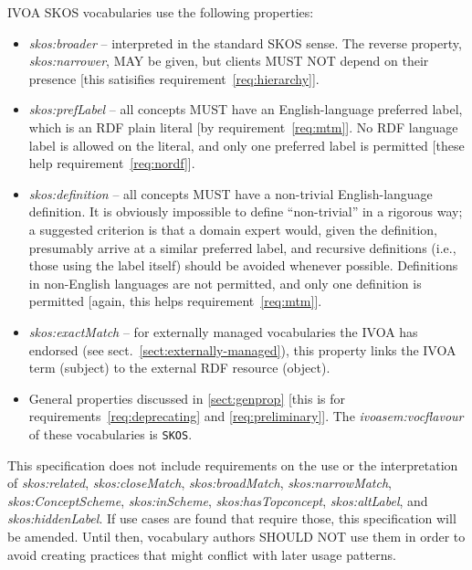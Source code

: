 \documentclass[11pt,a4paper]{ivoa}
\newcommand{\vocterm}[1]{\emph{\color{termcolor}#1}}
\begin{document}
IVOA SKOS vocabularies use the following properties:

\begin{itemize}
\item \vocterm{skos:broader} -- interpreted in the standard SKOS sense.
The reverse property, \vocterm{skos:narrower}, MAY be given, but clients
MUST NOT depend on their presence [this satisifies
requirement~\ref{req:hierarchy}].

\item \vocterm{skos:prefLabel} -- all concepts MUST have an
English-language preferred label, which is an RDF plain literal [by
requirement~\ref{req:mtm}].  No RDF language label is allowed on the
literal, and only one preferred label is permitted
[these help requirement~\ref{req:nordf}].

\item \vocterm{skos:definition} -- all concepts MUST have a non-trivial
English-language definition.  It is obviously impossible to define
``non-trivial'' in a rigorous way; a suggested criterion is that a
domain expert would, given the definition, presumably arrive at a
similar preferred label, and recursive definitions (i.e., those using
the label itself) should be avoided whenever possible.  Definitions in
non-English languages are not permitted, and only one definition is
permitted [again, this helps requirement~\ref{req:mtm}].

\item \vocterm{skos:exactMatch} -- for externally managed vocabularies
the IVOA has endorsed (see sect.~\ref{sect:externally-managed}), this
property links the IVOA term (subject) to the external RDF resource
(object).

\item General properties discussed in \ref{sect:genprop} [this is
for requirements~\ref{req:deprecating} and
\ref{req:preliminary}].  The \vocterm{ivoasem:vocflavour} of these
vocabularies is \verb|SKOS|.
\end{itemize}

This specification does not include requirements on the use or the
interpretation of \vocterm{skos:related}, 
\vocterm{skos:closeMatch}, \vocterm{skos:broadMatch},
\vocterm{skos:narrowMatch}, \vocterm{skos:ConceptScheme},
\vocterm{skos:inScheme}, \vocterm{skos:hasTopconcept},
\vocterm{skos:altLabel}, and \vocterm{skos:hiddenLabel}. If use cases
are found that require those, this specification will be amended.  Until
then, vocabulary authors SHOULD NOT use them in order to avoid creating
practices that might conflict with later usage patterns.
\end{document}
